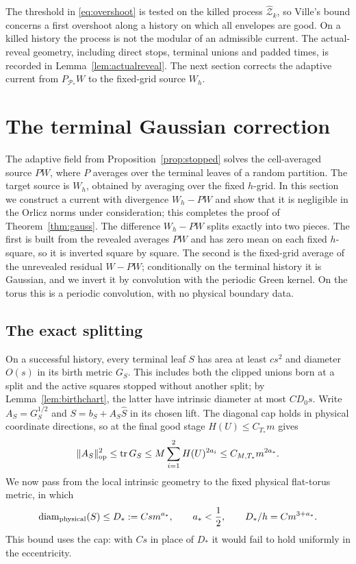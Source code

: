 \documentclass[11pt]{article}
\theoremstyle{definition}
\theoremstyle{remark}
\numberwithin{equation}{section}
\newcommand{\pr}{\mathcal P}
\newcommand{\diam}{\operatorname{diam}}
\begin{document}
The threshold in \eqref{eq:overshoot} is tested on the killed
process $\widehat{\mathcal Z}_k$, so Ville's bound concerns a first
overshoot along a history on which all envelopes are good. On a killed
history the process is not the modular of an admissible current. The actual-reveal geometry,
including direct stops, terminal unions and padded times, is recorded
in Lemma~\ref{lem:actualreveal}. The next section corrects the
adaptive current from $P_{\pr_*}W$ to the fixed-grid source $W_h$.
\section{The terminal Gaussian correction}\label{sec:terminal}

The adaptive field from Proposition~\ref{prop:stopped} solves the
cell-averaged source $PW$, where $P$ averages over the terminal leaves
of a random partition. The target source is $W_h$, obtained by averaging
over the fixed $h$-grid. In this section we construct a current with
divergence $W_h-PW$ and show that it is negligible in the Orlicz norms
under consideration; this completes the proof of Theorem~\ref{thm:gauss}.
The difference $W_h-PW$ splits exactly into two pieces. The first is
built from the revealed averages $PW$ and has zero mean on each fixed
$h$-square, so it is inverted square by square. The second is the
fixed-grid average of the unrevealed residual $W-PW$; conditionally on
the terminal history it is Gaussian, and we invert it by convolution
with the periodic Green kernel. On the torus this is a periodic
convolution, with no physical boundary data.

\subsection{The exact splitting}
On a successful history, every terminal leaf $S$ has area at
least $cs^2$ and diameter $O(s)$ in its birth metric $G_S$.
This includes both the clipped unions born at a split and the active
squares stopped without another split; by Lemma~\ref{lem:birthchart},
the latter have intrinsic diameter at most $C D_0s$.
Write $A_S=G_S^{1/2}$ and $S=b_S+A_S\widehat S$ in its chosen
lift. The diagonal cap holds in physical coordinate directions,
so at the final good stage $H(U)\le C_{T_*}m$ gives
\[
 \|A_S\|_{\rm op}^2\le\operatorname{tr}G_S
 \le M\sum_{i=1}^2H(U)^{2a_i}\le C_{M,T_*}m^{2a_*}.
\]
We now pass from the local intrinsic geometry to the fixed physical
flat-torus metric, in which
\begin{equation}\label{eq:Dstar}
 \diam_{\rm physical}(S)\le D_*:=Csm^{a_*},
 \qquad a_*<\frac12,\qquad D_*/h=Cm^{3+a_*}.
\end{equation}
This bound uses the cap: with $Cs$ in place of $D_*$ it would fail to
hold uniformly in the eccentricity.
\end{document}
